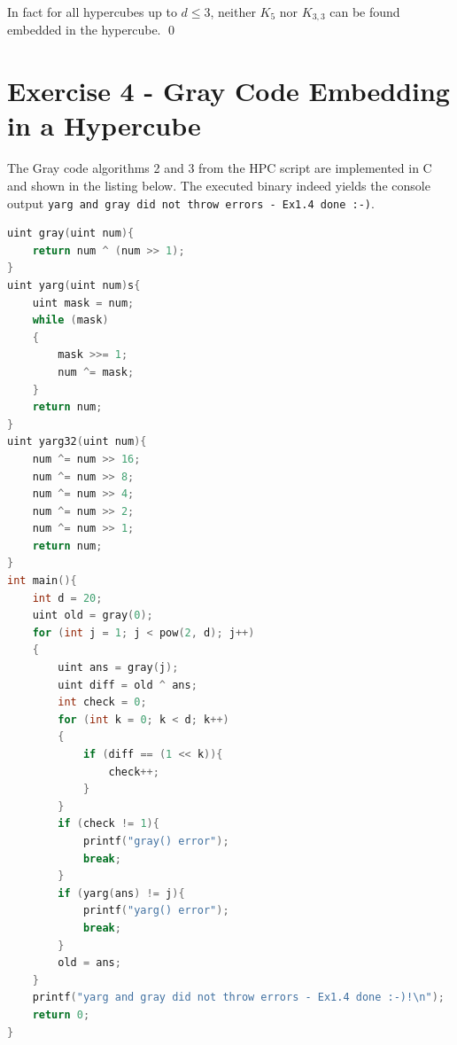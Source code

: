 In fact for all hypercubes up to $d \le 3$, neither $K_5$ nor $K_{3,3}$ can be found embedded in the hypercube. \linebreak \qed

\pagebreak

\section{Exercise 4 - Gray Code Embedding in a Hypercube}
The Gray code algorithms 2 and 3 from the HPC script are implemented in C and shown in the listing below. The executed binary indeed yields
the console output \texttt{yarg and gray did not throw errors - Ex1.4 done :-)}.

\begin{lstlisting}[language=C, title=C Language Listing for EX1.4 ]
uint gray(uint num){
    return num ^ (num >> 1); 
}
uint yarg(uint num)s{
    uint mask = num;
    while (mask)
    { 
        mask >>= 1;
        num ^= mask;
    }
    return num;
}
uint yarg32(uint num){
    num ^= num >> 16;
    num ^= num >> 8;
    num ^= num >> 4;
    num ^= num >> 2;
    num ^= num >> 1;
    return num;
}
int main(){
    int d = 20;
    uint old = gray(0);
    for (int j = 1; j < pow(2, d); j++)
    {
        uint ans = gray(j);
        uint diff = old ^ ans;
        int check = 0;
        for (int k = 0; k < d; k++)
        {
            if (diff == (1 << k)){
                check++;
            }
        }
        if (check != 1){
            printf("gray() error");
            break;
        }
        if (yarg(ans) != j){
            printf("yarg() error");
            break;
        }
        old = ans;
    }
    printf("yarg and gray did not throw errors - Ex1.4 done :-)!\n");
    return 0;
}
\end{lstlisting}

\pagebreak
